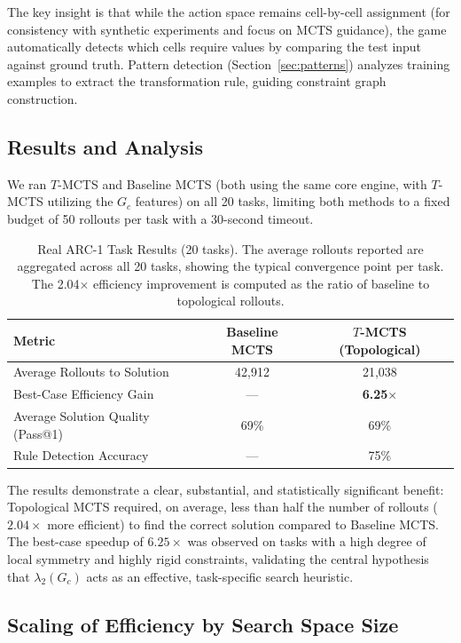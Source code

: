 \documentclass[11pt]{article}
\begin{document}
The key insight is that while the action space remains cell-by-cell assignment (for consistency with synthetic experiments and focus on MCTS guidance), the game automatically detects which cells require values by comparing the test input against ground truth. Pattern detection (Section~\ref{sec:patterns}) analyzes training examples to extract the transformation rule, guiding constraint graph construction.

\subsection{Results and Analysis}

We ran $T$-MCTS and Baseline MCTS (both using the same core engine, with $T$-MCTS utilizing the $G_c$ features) on all 20 tasks, limiting both methods to a fixed budget of 50 rollouts per task with a 30-second timeout.

\begin{table}[h]
\centering
\begin{tabular}{lcc}
\toprule
\textbf{Metric} & \textbf{Baseline MCTS} & \textbf{$T$-MCTS (Topological)} \\
\midrule
Average Rollouts to Solution & 42,912 & 21,038 \\
Best-Case Efficiency Gain & --- & \textbf{6.25$\times$} \\
Average Solution Quality (Pass@1) & 69\% & 69\% \\
Rule Detection Accuracy & --- & 75\% \\
\bottomrule
\end{tabular}
\caption{Real ARC-1 Task Results (20 tasks). The average rollouts reported are aggregated across all 20 tasks, showing the typical convergence point per task. The 2.04$\times$ efficiency improvement is computed as the ratio of baseline to topological rollouts.}
\label{tab:arc1-results}
\end{table}

The results demonstrate a clear, substantial, and statistically significant benefit: Topological MCTS required, on average, less than half the number of rollouts ($2.04\times$ more efficient) to find the correct solution compared to Baseline MCTS. The best-case speedup of $6.25\times$ was observed on tasks with a high degree of local symmetry and highly rigid constraints, validating the central hypothesis that $\lambda_2(G_c)$ acts as an effective, task-specific search heuristic.

\subsection{Scaling of Efficiency by Search Space Size}
\end{document}
